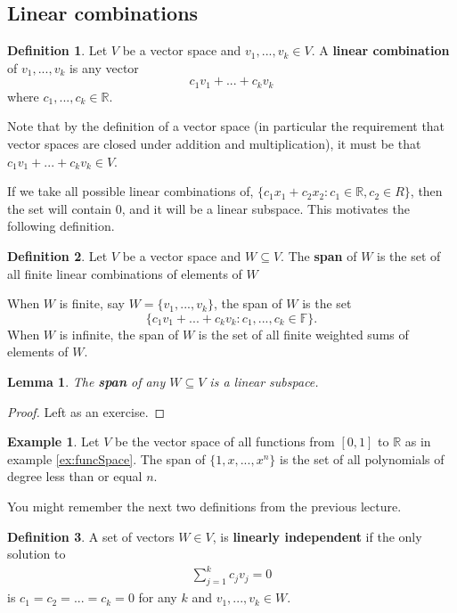\documentclass[12pt,reqno]{amsart}
\def\F{\mathbb{F}}
\def\R{\mathbb{R}}
\newtheorem{lemma}{Lemma}[section]
\theoremstyle{definition}
\newtheorem{definition}{Definition}[section]
\newtheorem{example}{Example}[section]
\begin{document}
\subsection{Linear combinations}

\begin{definition}
  Let $V$ be a vector space and $v_1,..., v_k \in V$. A \textbf{linear
    combination} of $v_1,..., v_k$ is any vector 
  \[c_1 v_1 + ... + c_k v_k \]
  where $c_1, ..., c_k \in \R$. 
\end{definition}
Note that by the definition of a vector space (in particular the
requirement that vector spaces are closed under addition and
multiplication), it must be that $c_1 v_1 + ... + c_k v_k \in V$. 

If we take all possible linear combinations of, $\{c_1 x_1 + c_2
x_2 : c_1 \in \R, c_2 \in R\}$, then the set will contain $0$, and it
will be a linear subspace. This motivates the following definition.
\begin{definition}
  Let $V$ be a vector space and $W \subseteq V$. The
  \textbf{span} of $W$ is the set
  of all finite linear combinations of elements of $W$
\end{definition}
When $W$ is finite, say $W = \{v_1, ..., v_k\}$, the span of $W$ is
the set 
\[ \{ c_1 v_1 + ... + c_k v_k : c_1, ..., c_k \in \F \}. \] When $W$
is infinite, the span of $W$ is the set of all finite weighted sums of
elements of $W$.
\begin{lemma}
  The \textbf{span} of any  $W \subseteq V$ is a linear subspace.
\end{lemma}
\begin{proof}
  Left as an exercise.
\end{proof}

\begin{example}
  Let $V$ be the vector space of all functions from $[0,1]$ to $\R$ as
  in example \ref{ex:funcSpace}. The span of $\{1, x, ..., x^n\}$ is
  the set of all polynomials of degree less than or equal $n$.
\end{example}

You might remember the next two definitions from the previous lecture.
\begin{definition}
  A set of vectors $W \in V$, is \textbf{linearly
    independent} if the only solution to
  \begin{align*}
    \sum_{j=1}^k c_j v_j = 0 
  \end{align*}
  is $c_1 = c_2 = ... = c_k = 0$ for any $k$ and $v_1, ..., v_k \in W$.
\end{definition}
\end{document}
